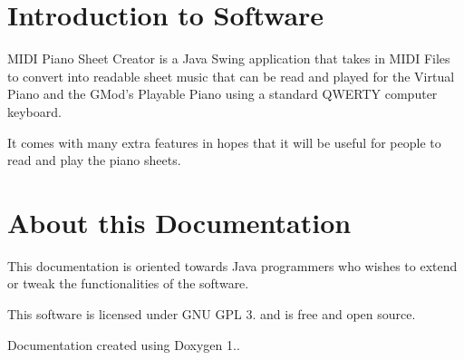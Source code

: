 \hypertarget{index_intro}{}\section{Introduction to Software}\label{index_intro}
M\+I\+D\+I Piano Sheet Creator is a Java Swing application that takes in M\+I\+D\+I Files to convert into readable sheet music that can be read and played for the Virtual Piano and the G\+Mod's Playable Piano using a standard Q\+W\+E\+R\+T\+Y computer keyboard.

It comes with many extra features in hopes that it will be useful for people to read and play the piano sheets.\hypertarget{index_about}{}\section{About this Documentation}\label{index_about}
This documentation is oriented towards Java programmers who wishes to extend or tweak the functionalities of the software.

This software is licensed under G\+N\+U G\+P\+L 3. and is free and open source.

Documentation created using Doxygen 1.. 